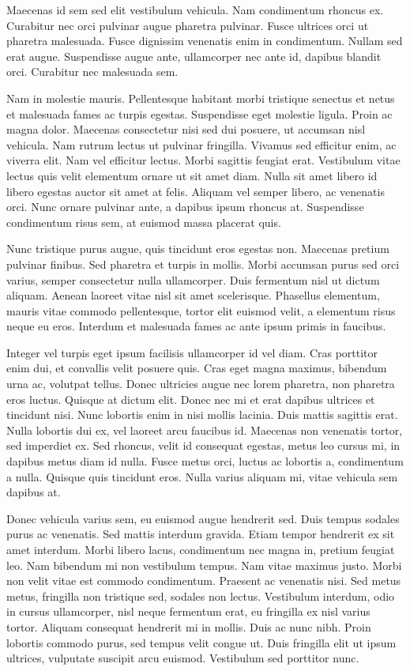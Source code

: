 Maecenas id sem sed elit vestibulum vehicula. Nam condimentum rhoncus ex. Curabitur nec orci pulvinar augue pharetra pulvinar. Fusce ultrices orci ut pharetra malesuada. Fusce dignissim venenatis enim in condimentum. Nullam sed erat augue. Suspendisse augue ante, ullamcorper nec ante id, dapibus blandit orci. Curabitur nec malesuada sem.

Nam in molestie mauris. Pellentesque habitant morbi tristique senectus et netus et malesuada fames ac turpis egestas. Suspendisse eget molestie ligula. Proin ac magna dolor. Maecenas consectetur nisi sed dui posuere, ut accumsan nisl vehicula. Nam rutrum lectus ut pulvinar fringilla. Vivamus sed efficitur enim, ac viverra elit. Nam vel efficitur lectus. Morbi sagittis feugiat erat. Vestibulum vitae lectus quis velit elementum ornare ut sit amet diam. Nulla sit amet libero id libero egestas auctor sit amet at felis. Aliquam vel semper libero, ac venenatis orci. Nunc ornare pulvinar ante, a dapibus ipsum rhoncus at. Suspendisse condimentum risus sem, at euismod massa placerat quis.

Nunc tristique purus augue, quis tincidunt eros egestas non. Maecenas pretium pulvinar finibus. Sed pharetra et turpis in mollis. Morbi accumsan purus sed orci varius, semper consectetur nulla ullamcorper. Duis fermentum nisl ut dictum aliquam. Aenean laoreet vitae nisl sit amet scelerisque. Phasellus elementum, mauris vitae commodo pellentesque, tortor elit euismod velit, a elementum risus neque eu eros. Interdum et malesuada fames ac ante ipsum primis in faucibus.

Integer vel turpis eget ipsum facilisis ullamcorper id vel diam. Cras porttitor enim dui, et convallis velit posuere quis. Cras eget magna maximus, bibendum urna ac, volutpat tellus. Donec ultricies augue nec lorem pharetra, non pharetra eros luctus. Quisque at dictum elit. Donec nec mi et erat dapibus ultrices et tincidunt nisi. Nunc lobortis enim in nisi mollis lacinia. Duis mattis sagittis erat. Nulla lobortis dui ex, vel laoreet arcu faucibus id. Maecenas non venenatis tortor, sed imperdiet ex. Sed rhoncus, velit id consequat egestas, metus leo cursus mi, in dapibus metus diam id nulla. Fusce metus orci, luctus ac lobortis a, condimentum a nulla. Quisque quis tincidunt eros. Nulla varius aliquam mi, vitae vehicula sem dapibus at.

Donec vehicula varius sem, eu euismod augue hendrerit sed. Duis tempus sodales purus ac venenatis. Sed mattis interdum gravida. Etiam tempor hendrerit ex sit amet interdum. Morbi libero lacus, condimentum nec magna in, pretium feugiat leo. Nam bibendum mi non vestibulum tempus. Nam vitae maximus justo. Morbi non velit vitae est commodo condimentum. Praesent ac venenatis nisi. Sed metus metus, fringilla non tristique sed, sodales non lectus. Vestibulum interdum, odio in cursus ullamcorper, nisl neque fermentum erat, eu fringilla ex nisl varius tortor. Aliquam consequat hendrerit mi in mollis. Duis ac nunc nibh. Proin lobortis commodo purus, sed tempus velit congue ut. Duis fringilla elit ut ipsum ultrices, vulputate suscipit arcu euismod. Vestibulum sed porttitor nunc.

